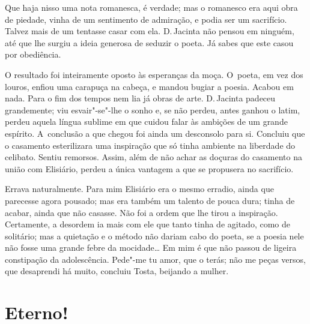 \begin{linenumbers}
Que haja nisso uma nota romanesca, é verdade; mas o romanesco era aqui
obra de piedade, vinha de um sentimento de admiração, e podia ser um
sacrifício. Talvez mais de um tentasse casar com ela. D.\,Jacinta não
pensou em ninguém, até que lhe surgiu a ideia generosa de seduzir o
poeta. Já sabes que este casou por obediência.

O resultado foi inteiramente oposto às esperanças da moça. O~poeta, em
vez dos louros, enfiou uma carapuça na cabeça, e mandou bugiar a poesia.
Acabou em nada. Para o fim dos tempos nem lia já obras de arte. D.\,Jacinta padeceu grandemente; viu esvair"-se"-lhe o sonho e, se não perdeu,
antes ganhou o latim, perdeu aquela língua sublime em que cuidou falar
às ambições de um grande espírito. A~conclusão a que chegou foi ainda um
desconsolo para si. Concluiu que o casamento esterilizara uma inspiração
que só tinha ambiente na liberdade do celibato. Sentiu remorsos. Assim,
além de não achar as doçuras do casamento na união com Elisiário, perdeu
a única vantagem a que se propusera no sacrifício.

Errava naturalmente. Para mim Elisiário era o mesmo erradio, ainda que
parecesse agora pousado; mas era também um talento de pouca dura; tinha
de acabar, ainda que não casasse. Não foi a ordem que lhe tirou a
inspiração. Certamente, a desordem ia mais com ele que tanto tinha de
agitado, como de solitário; mas a quietação e o método não dariam cabo
do poeta, se a poesia nele não fosse uma grande febre da mocidade\ldots{} Em
mim é que não passou de ligeira constipação da adolescência. Pede"-me tu
amor, que o terás; não me peças versos, que desaprendi há muito,
concluiu Tosta, beijando a mulher.

\end{linenumbers}

\chapter{Eterno!}

